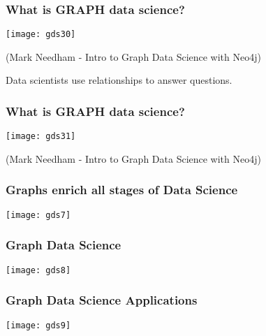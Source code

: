 \begin{frame}[fragile]\frametitle{What is GRAPH data science?}

\begin{center}
\texttt{[image: gds30]}

{\tiny (Mark Needham - Intro to Graph Data Science with Neo4j)}

\end{center}

Data scientists use relationships to answer questions.
\end{frame}

\begin{frame}[fragile]\frametitle{What is GRAPH data science?}

\begin{center}
\texttt{[image: gds31]}

{\tiny (Mark Needham - Intro to Graph Data Science with Neo4j)}

\end{center}

\end{frame}



\begin{frame}[fragile]\frametitle{Graphs enrich all stages of Data Science}

\begin{center}
\texttt{[image: gds7]}
\end{center}

\end{frame}


\begin{frame}[fragile]\frametitle{Graph Data Science}

\begin{center}
\texttt{[image: gds8]}
\end{center}

\end{frame}

\begin{frame}[fragile]\frametitle{Graph Data Science Applications}

\begin{center}
\texttt{[image: gds9]}
\end{center}

\end{frame}

